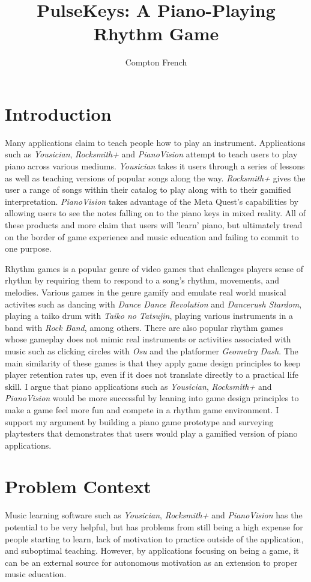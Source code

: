 \documentclass[10pt,twocolumn]{article}
\title{PulseKeys: A Piano-Playing Rhythm Game}
\author{Compton French}
\affiliation{Occidental College}
\begin{document}
\maketitle

\section{Introduction}

Many applications claim to teach people how to play an instrument. Applications such as \textit{Yousician}, \textit{Rocksmith+} and \textit{PianoVision} attempt to teach users to play piano across various mediums. \textit{Yousician} takes it users through a series of lessons as well as teaching versions of popular songs along the way. \textit{Rocksmith+} gives the user a range of songs within their catalog to play along with to their gamified interpretation. \textit{PianoVision} takes advantage of the Meta Quest's capabilities by allowing users to see the notes falling on to the piano keys in mixed reality. All of these products and more claim that users will 'learn' piano, but ultimately tread on the border of game experience and music education and failing to commit to one purpose. 

Rhythm games is a popular genre of video games that challenges players sense of rhythm by requiring them to respond to a song's rhythm, movements, and melodies. Various games in the genre gamify and emulate real world musical activites such as dancing with \textit{Dance Dance Revolution} and \textit{Dancerush Stardom}, playing a taiko drum with \textit{Taiko no Tatsujin}, playing various instruments in a band with \textit{Rock Band}, among others. There are also popular rhythm games whose gameplay does not mimic real instruments or activities associated with music such as clicking circles with \textit{Osu} and the platformer \textit{Geometry Dash}. The main similarity of these games is that they apply game design principles to keep player retention rates up, even if it does not translate directly to a practical life skill. I argue that piano applications such as \textit{Yousician}, \textit{Rocksmith+} and \textit{PianoVision} would be more successful by leaning into game design principles to make a game feel more fun and compete in a rhythm game environment. I support my argument by building a piano game prototype and surveying playtesters that demonstrates that users would play a gamified version of piano applications.


\section{Problem Context}
Music learning software such as \textit{Yousician}, \textit{Rocksmith+} and \textit{PianoVision} has the potential to be very helpful, but has problems from still being a high expense for people starting to learn, lack of motivation to practice outside of the application, and suboptimal teaching. However, by applications focusing on being a game, it can be an external source for autonomous motivation as an extension to proper music education.
\end{document}
